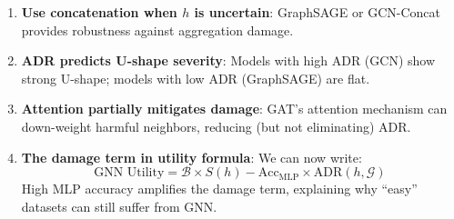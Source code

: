 \begin{enumerate}
    \item \textbf{Use concatenation when $h$ is uncertain}: GraphSAGE or GCN-Concat provides robustness against aggregation damage.

    \item \textbf{ADR predicts U-shape severity}: Models with high ADR (GCN) show strong U-shape; models with low ADR (GraphSAGE) are flat.

    \item \textbf{Attention partially mitigates damage}: GAT's attention mechanism can down-weight harmful neighbors, reducing (but not eliminating) ADR.

    \item \textbf{The damage term in utility formula}: We can now write:
    \begin{equation}
        \text{GNN Utility} = \mathcal{B} \times S(h) - \text{Acc}_{\text{MLP}} \times \text{ADR}(h, \mathcal{G})
    \end{equation}
    High MLP accuracy amplifies the damage term, explaining why ``easy'' datasets can still suffer from GNN.
\end{enumerate}
